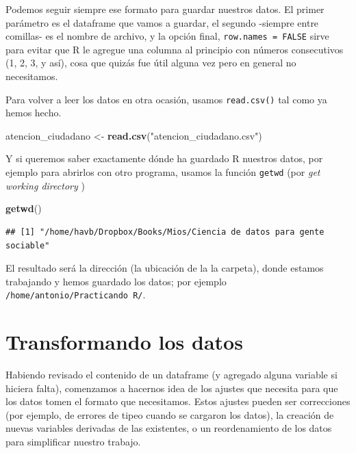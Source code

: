 \documentclass[spanish,]{book}
\newenvironment{Shaded}{\begin{snugshade}}{\end{snugshade}}
\newcommand{\KeywordTok}[1]{\textcolor[rgb]{0.13,0.29,0.53}{\textbf{#1}}}
\newcommand{\NormalTok}[1]{#1}
\newcommand{\StringTok}[1]{\textcolor[rgb]{0.31,0.60,0.02}{#1}}
\begin{document}
Podemos seguir siempre ese formato para guardar nuestros datos. El primer parámetro es el dataframe que vamos a guardar, el segundo -siempre entre comillas- es el nombre de archivo, y la opción final, \texttt{row.names\ =\ FALSE} sirve para evitar que R le agregue una columna al principio con números consecutivos (1, 2, 3, y así), cosa que quizás fue útil alguna vez pero en general no necesitamos.

Para volver a leer los datos en otra ocasión, usamos \texttt{read.csv()} tal como ya hemos hecho.

\begin{Shaded}
\begin{Highlighting}[]
\NormalTok{atencion_ciudadano <-}\StringTok{ }\KeywordTok{read.csv}\NormalTok{(}\StringTok{"atencion_ciudadano.csv"}\NormalTok{)}
\end{Highlighting}
\end{Shaded}

Y si queremos saber exactamente dónde ha guardado R nuestros datos, por ejemplo para abrirlos con otro programa, usamos la función \texttt{getwd} (por \emph{get working directory} )

\begin{Shaded}
\begin{Highlighting}[]
\KeywordTok{getwd}\NormalTok{()}
\end{Highlighting}
\end{Shaded}

\begin{verbatim}
## [1] "/home/havb/Dropbox/Books/Mios/Ciencia de datos para gente sociable"
\end{verbatim}

El resultado será la dirección (la ubicación de la la carpeta), donde estamos trabajando y hemos guardado los datos; por ejemplo \texttt{/home/antonio/Practicando\ R/}.

\hypertarget{transformando-los-datos}{%
\section{Transformando los datos}\label{transformando-los-datos}}

Habiendo revisado el contenido de un dataframe (y agregado alguna variable si hiciera falta), comenzamos a hacernos idea de los ajustes que necesita para que los datos tomen el formato que necesitamos. Estos ajustes pueden ser correcciones (por ejemplo, de errores de tipeo cuando se cargaron los datos), la creación de nuevas variables derivadas de las existentes, o un reordenamiento de los datos para simplificar nuestro trabajo.
\end{document}
